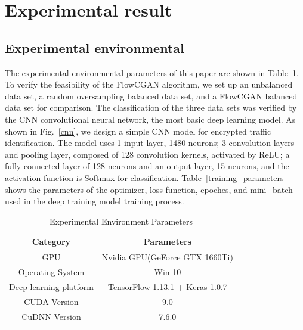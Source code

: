 \documentclass[conference]{IEEEtran}
\begin{document}
\section{Experimental result}\label{results}
\subsection {Experimental environmental}

The experimental environmental parameters of this paper are shown in Table~\ref{parameters}. To verify the feasibility of the FlowCGAN algorithm, we set up an unbalanced data set, a random oversampling balanced data set, and a FlowCGAN balanced data set for comparison. The classification of the three data sets was verified by the CNN convolutional neural network, the most basic deep learning model. As shown in Fig.~\ref{cnn}, we design a simple CNN model for encrypted traffic identification. The model uses 1 input layer, 1480 neurons; 3 convolution layers and pooling layer, composed of 128 convolution kernels, activated by ReLU; a fully connected layer of 128 neurons and an output layer, 15 neurons, and the activation function is Softmax for classification. Table~\ref{training_parameters} shows the parameters of the optimizer, loss function, epoches, and mini\_batch used in the deep training model training process.


\linespread{1.5}
\begin{table}[htbp]
\caption{Experimental Environment Parameters}
\begin{center}
\begin{tabular}{c c}
\hline
\textbf{Category}&{\textbf{Parameters}} \\
\hline
GPU & Nvidia GPU(GeForce GTX 1660Ti)  \\
Operating System & Win 10 \\
Deep learning platform & TensorFlow 1.13.1 + Keras 1.0.7\\
CUDA Version & 9.0\\
CuDNN Version & 7.6.0
\end{tabular}
\label{parameters}
\end{center}
\end{table}
\end{document}
